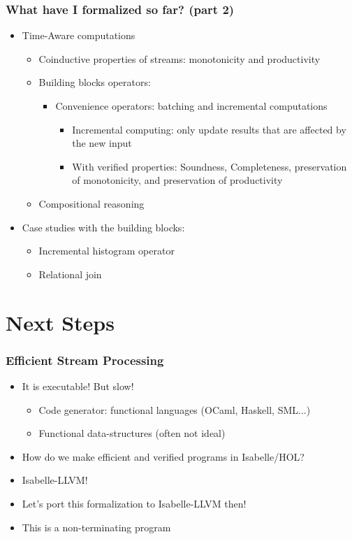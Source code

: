 \documentclass[aspectratio=169,10pt]{beamer}
\begin{document}
\begin{frame}[fragile]
  \frametitle{What have I formalized so far?  (part 2)}
  \begin{itemize}
    \item Time-Aware computations
          \begin{itemize}
            \item Coinductive properties of streams: monotonicity and productivity
            \item Building blocks operators:
                  \begin{itemize}
                    \item Convenience operators: batching and incremental computations
                          \begin{itemize}
                            \item Incremental computing: only update results that are affected by the new input
                            \item With verified properties: Soundness, Completeness, preservation of monotonicity, and preservation of productivity
                          \end{itemize}
                  \end{itemize}
            \item Compositional reasoning
          \end{itemize}
    \item Case studies with the building blocks:
          \begin{itemize}
            \item Incremental histogram operator
            \item Relational join
          \end{itemize}
  \end{itemize}
\end{frame}

\section{Next Steps}

\begin{frame}[fragile]
  \frametitle{Efficient Stream Processing}
  \begin{itemize}
    \item It is executable! But slow!
          \begin{itemize}
            \item Code generator: functional languages (OCaml, Haskell, SML...)
            \item Functional data-structures (often not ideal)
          \end{itemize}
    \pause
    \item How do we make efficient and verified programs in Isabelle/HOL?
          \pause
          \item Isabelle-LLVM!
          \item Let's port this formalization to Isabelle-LLVM then!
    \item This is a non-terminating program
    \end{itemize}
\end{frame}
\end{document}
